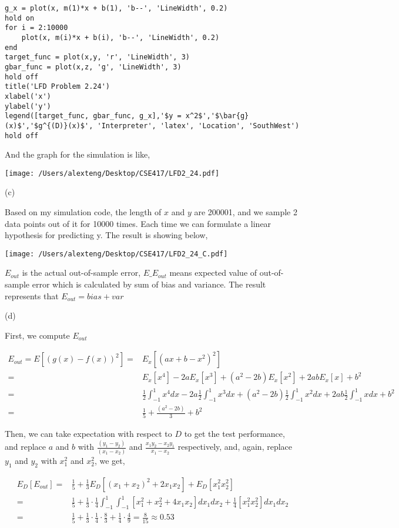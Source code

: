 \documentclass[11pt]{article}
\begin{document}
\begin{enumerate}
\begin{lstlisting}
g_x = plot(x, m(1)*x + b(1), 'b--', 'LineWidth', 0.2)
hold on
for i = 2:10000
    plot(x, m(i)*x + b(i), 'b--', 'LineWidth', 0.2)
end
target_func = plot(x,y, 'r', 'LineWidth', 3)
gbar_func = plot(x,z, 'g', 'LineWidth', 3)
hold off
title('LFD Problem 2.24')
xlabel('x')
ylabel('y')
legend([target_func, gbar_func, g_x],'$y = x^2$','$\bar{g}(x)$','$g^{(D)}(x)$', 'Interpreter', 'latex', 'Location', 'SouthWest')
hold off
\end{lstlisting}

And the graph for the simulation is like,

\texttt{[image: /Users/alexteng/Desktop/CSE417/LFD2\_24.pdf]}


\pagebreak

(c)

Based on my simulation code, the length of $x$ and $y$ are 200001, and we sample 2 data points out of it for 10000 times. Each time we can formulate a linear hypothesis for predicting y. The result is showing below, 

\texttt{[image: /Users/alexteng/Desktop/CSE417/LFD2\_24\_C.pdf]}

$E_{out}$ is the actual out-of-sample error, $E\_E_{out}$ means expected value of out-of-sample error which is calculated by sum of bias and variance. The result represents that $E_{out} = bias + var$

(d)

First, we compute $E_{out}$

\begin{equation}
\begin{aligned}
E_{out} = E[(g(x)-f(x))^2] =&E_x[(ax+b-x^2)^2]\\
=& E_x[x^4] -2aE_x[x^3]+(a^2 -2b)E_x[x^2]+2abE_x[x]+b^2\\
=& \frac{1}{2}\int_{-1}^{1}x^4dx-2a\frac{1}{2}\int_{-1}^{1}x^3dx+(a^2-2b)\frac{1}{2}\int_{-1}^{1}x^2dx+2ab\frac{1}{2}\int_{-1}^{1}xdx+b^2\\
=& \frac{1}{5} + \frac{(a^2-2b)}{3}+ b^2
\end{aligned}
\end{equation}

Then, we can take expectation with respect to $D$ to get the test performance, and replace $a$ and $b$ with $\frac{(y_1-y_2)}{(x_1-x_2)}$ and $\frac{x_1y_2 - x_2y_1}{x_1 - x_2}$ respectively, and, again, replace $y_1$ and $y_2$ with $x_1^2$ and $x_2^2$, we get,

\begin{equation}
\begin{aligned}
E_D[E_{out}] =& \frac{1}{5}+\frac{1}{3}E_D[(x_1+x_2)^2 + 2x_1x_2] + E_D[x_1^2x_2^2]\\
=&\frac{1}{5}+\frac{1}{3}\cdot \frac{1}{4}\int_{-1}^{1}\int_{-1}^{1}[x_1^2+x_2^2 + 4x_1x_2]dx_1dx_2 + \frac{1}{4}[x_1^2x_2^2]dx_1dx_2\\
=& \frac{1}{5}+\frac{1}{3}\cdot \frac{1}{4} \cdot \frac{8}{3} + \frac{1}{4}\cdot \frac{4}{9} = \frac{8}{15} \approx 0.53
\end{aligned}
\end{equation}


\end{enumerate}
\end{document}
